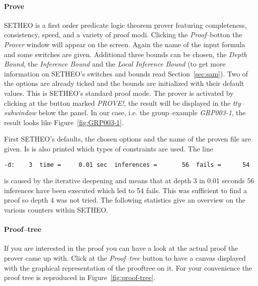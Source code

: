 \paragraph{Prove}
SETHEO is a first order predicate logic theorem prover featuring
completeness, consistency, speed, and a variety of proof
modi. Clicking the {\it Proof\/}--botton the {\it Prover\/} window
will appear on the screen. Again the name of the input formula and
some switches are given. Additional three bounds can be chosen, the
{\it Depth Bound\/}, the {\it Inference Bound\/} and the {\it Local
Inference Bound\/} (to get more information on SETHEO's switches and
bounds read Section~\ref{sec:sam}). Two of the options are already
ticked and the bounds are initialized with their default values. This
is SETHEO's standard proof mode. The prover is activated by clicking
at the button marked {\it PROVE!\/}, the result will be displayed in
the {\it tty--subwindow\/} below the panel. In our case, i.e. the
group--example {\it GRP003-1\/}, the result looks like
Figure~\ref{fig:GRP003-1}.



First SETHEO's defaults, the chosen options and the name of the proven
file are given. Is is also printed which types of constraints are
used. The line 
\begin{verbatim}
-d:    3  time =     0.01 sec  inferences =       56  fails =      54
\end{verbatim}
is caused by the iterative deepening and means that at depth 3 in 0.01
seconds 56 inferences have been executed which led to 54 fails. This
was sufficient to find a proof so depth 4 was not tried. The following
statistics give an overview on the various counters within SETHEO.

\paragraph{Proof--tree}
If you are interested in the proof you can have a look at the actual
proof the prover came up with. Click at the {\it Proof--tree\/} button
to have a canvas displayed with the graphical representation of the
prooftree on it. For your convenience the proof tree is reproduced in
Figure~\ref{fig:proof-tree}. 
%

